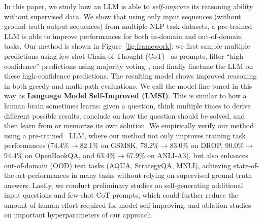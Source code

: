 In this paper, we study how an LLM is able to \textit{self-improve} its reasoning ability without supervised data. We show that using only
input sequences (without ground truth output sequences) from multiple NLP task datasets, a pre-trained LLM is able to improve performances for both in-domain and out-of-domain tasks. 
Our method is shown in Figure~\ref{fig:framework}: we first sample multiple predictions using few-shot Chain-of-Thought (CoT)~\citep{Wei2022ChainOT} as prompts, filter ``high-confidence'' predictions using majority voting~\citep{Wang2022SelfConsistencyIC}, and finally finetune the LLM on these high-confidence predictions. The resulting model shows improved reasoning in both greedy and multi-path evaluations.
We call the model fine-tuned in this way as \textbf{Language Model Self-Improved (LMSI)}. This is similar to how a human brain sometimes learns: given a question, think multiple times to derive different possible results, conclude on how the question should be solved, and then learn from or memorize its own solution.
We empirically verify our method using a pre-trained \bigmodel~LLM, where our method not only improves training task performances (74.4\%$\rightarrow$82.1\% on GSM8K, 78.2\%$\rightarrow$83.0\% on DROP, 90.0\%$\rightarrow$94.4\% on OpenBookQA, and 63.4\%$\rightarrow$67.9\% on ANLI-A3), but also enhances out-of-domain (OOD) test tasks (AQUA, 
StrategyQA, 
MNLI), achieving state-of-the-art performances in many tasks without relying on supervised ground truth answers. Lastly, we conduct preliminary studies on self-generating additional input questions and few-shot CoT prompts, which could further reduce the amount of human effort required for model self-improving, and ablation studies on important hyperparameters of our approach. 
